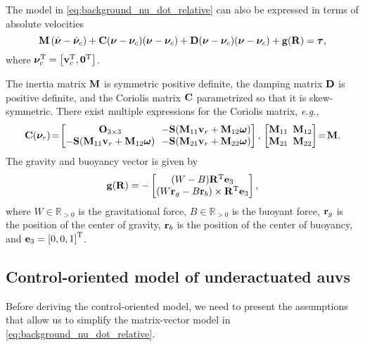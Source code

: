 The model in \eqref{eq:background_nu_dot_relative} can also be expressed in terms of absolute velocities
\begin{equation}
    \mathbf{M} \left(\dot{\bm{\nu}} - \dot{\bm{\nu}}_c\right) + \mathbf{C}(\bm{\nu} - \bm{\nu}_c)(\bm{\nu} - \bm{\nu}_c) + \mathbf{D}(\bm{\nu} - \bm{\nu}_c)(\bm{\nu} - \bm{\nu}_c) + \mathbf{g}(\mathbf{R}) = \bm{\tau},
\end{equation}
where $\bm{\nu}_c^{\mathrm{T}} = \left[\mathbf{v}_c^{\mathrm{T}}, \mathbf{0}^{\mathrm{T}}\right]$.

The inertia matrix $\mathbf{M}$ is symmetric positive definite, the damping matrix $\mathbf{D}$ is positive definite, and the Coriolis matrix $\mathbf{C}$ parametrized so that it is skew-symmetric.
There exist multiple expressions for the Coriolis matrix, \emph{e.g.,}
\begin{equation}
    \label{eq:background_coriolis}
    \mat{C}(\bs{\nu}_r)\! =\!
    \begin{bmatrix}
        \mat{O}_{3 \times 3} & \!\!-\mat{S}(\mat{M}_{11}\mat{v}_r + \mat{M}_{12}\bs{\omega}) \\
        -\mat{S}(\mat{M}_{11}\mat{v}_r + \mat{M}_{12}\bs{\omega}) & \!\!-\mat{S}(\mat{M}_{21}\mat{v}_r + \mat{M}_{22}\bs{\omega})
    \end{bmatrix}, \,
    \begin{bmatrix}
        \mat{M}_{11} & \!\!\!\mat{M}_{12} \\ \mat{M}_{21} & \!\!\!\mat{M}_{22}
    \end{bmatrix}\!
    = \!\mat{M}.
\end{equation}
The gravity and buoyancy vector is given by \cite{fossen_handbook_2011}
\begin{equation}
    \mathbf{g}(\mathbf{R}) = -
    \begin{bmatrix}
        (W - B) \mathbf{R}^{\mathrm{T}} \mathbf{e}_3 \\
        (W\mathbf{r}_g - B\mathbf{r}_b) \times \mathbf{R}^{\mathrm{T}} \mathbf{e}_3
    \end{bmatrix},
\end{equation}
where $W \in \mathbb{R}_{> 0}$ is the gravitational force, $B \in \mathbb{R}_{> 0}$ is the buoyant force, $\mathbf{r}_g$ is the position of the center of gravity, $\mathbf{r}_b$ is the position of the center of buoyancy, and $\mathbf{e}_3 = \left[0, 0, 1\right]^{\mathrm{T}}$.

\subsection{Control-oriented model of underactuated \glspl{auv}}
\label{sec:model_control_oriented}
Before deriving the control-oriented model, we need to present the assumptions that allow us to simplify the matrix-vector model in \eqref{eq:background_nu_dot_relative}.

